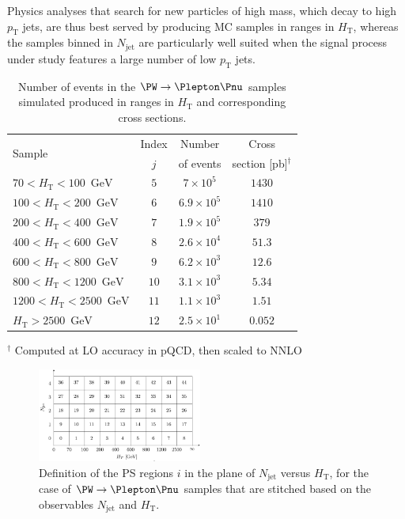 \documentclass[twocolumn,epjc3]{svjour3}
\newcommand{\pT}{\ensuremath{p_{\textrm{T}}}\xspace}
\newcommand{\HT}{\ensuremath{H_{\mathrm{T}}}\xspace}
\newcommand{\GeV}{\ensuremath{\textrm{GeV}}\xspace}
\newcommand{\jet}{\ensuremath{\textrm{jet}}\xspace}
\begin{document}
Physics analyses that search for new particles of high mass, which decay to high $\pT$ jets, are thus best served by producing MC samples in ranges in $\HT$,
whereas the samples binned in $N_{\jet}$ are particularly well suited when the signal process under study features a large number of low $\pT$ jets.

\begin{table}
\caption{
  Number of events in the $\PW \to \Plepton\Pnu$ samples simulated produced in ranges in $\HT$ and corresponding cross sections.
}
\label{tab:samples_WJets_vs_Njet_and_HT}
\begin{center}
\begin{tabular}{l|c|c|c}
\hline
\multirow{2}{20mm}{Sample} & Index & Number    & Cross                    \\
                           & $j$   & of events & section [pb]$^{\dagger}$ \\
\hline
$  70 < \HT <  100$~\GeV   &  $5$  & $7   \times 10^{5}$ & $1430$ \\
$ 100 < \HT <  200$~\GeV   &  $6$  & $6.9 \times 10^{5}$ & $1410$ \\
$ 200 < \HT <  400$~\GeV   &  $7$  & $1.9 \times 10^{5}$ & $379$  \\
$ 400 < \HT <  600$~\GeV   &  $8$  & $2.6 \times 10^{4}$ & $51.3$ \\
$ 600 < \HT <  800$~\GeV   &  $9$  & $6.2 \times 10^{3}$ & $12.6$ \\
$ 800 < \HT < 1200$~\GeV   & $10$  & $3.1 \times 10^{3}$ & $5.34$ \\
$1200 < \HT < 2500$~\GeV   & $11$  & $1.1 \times 10^{3}$ & $1.51$ \\
$       \HT > 2500$~\GeV   & $12$  & $2.5 \times 10^{1}$ & $0.052$ \\
\hline
\end{tabular}
\end{center}
$^{\dagger}$ Computed at LO accuracy in pQCD, then scaled to NNLO
\end{table}

\begin{figure}
\includegraphics[width=0.48\textwidth]{plots/regions_WJets_vs_Njet_and_HT.pdf}
\caption{
  Definition of the PS regions $i$ in the plane of $N_{\jet}$ versus $\HT$,
  for the case of $\PW \to \Plepton\Pnu$ samples that are stitched based on the observables $N_{\jet}$ and $\HT$.
}
\label{fig:regions_WJets_vs_Njet_and_HT}
\end{figure}
\end{document}
